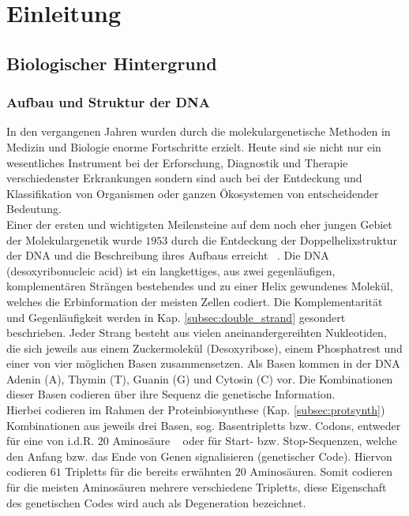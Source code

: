 \chapter{Einleitung} \label{sec:introduction}
\section{Biologischer Hintergrund} \label{sec:biology}
\subsection{Aufbau und Struktur der DNA} \label{subsec:dna}

In den vergangenen Jahren wurden durch die molekulargenetische Methoden in Medizin und Biologie enorme Fortschritte erzielt. Heute sind sie nicht nur ein wesentliches Instrument bei der Erforschung, Diagnostik und Therapie verschiedenster Erkrankungen sondern sind auch bei der Entdeckung und Klassifikation von Organismen oder ganzen Ökosystemen von entscheidender Bedeutung.  \\


Einer der ersten und wichtigsten Meilensteine auf dem noch eher jungen Gebiet der Molekulargenetik wurde $1953$ durch die Entdeckung der Doppelhelixstruktur der DNA und die Beschreibung ihres Aufbaus erreicht ~\cite{watson_1953}. Die DNA (desoxyribonucleic acid) ist ein langkettiges, aus zwei gegenläufigen, komplementären Strängen bestehendes und zu einer Helix gewundenes Molekül, welches die Erbinformation der meisten Zellen codiert. Die Komplementarität und Gegenläufigkeit werden in Kap. \ref{subsec:double_strand} gesondert beschrieben. Jeder Strang besteht aus vielen aneinandergereihten Nukleotiden, die sich jeweils aus einem Zuckermolekül (Desoxyribose), einem Phosphatrest und einer von vier möglichen Basen zusammensetzen. Als Basen kommen in der DNA Adenin (A), Thymin (T), Guanin (G) und Cytosin (C) vor. Die Kombinationen dieser Basen codieren über ihre Sequenz die genetische Information.  \\

Hierbei codieren im Rahmen der Proteinbiosynthese (Kap. \ref{subsec:protsynth}) Kombinationen aus jeweils drei Basen, sog. Basentripletts bzw. Codons, entweder für eine von i.d.R. $ 20 $ Aminosäure ~\cite{martin_1961, matthaei_1961} oder für Start- bzw. Stop-Sequenzen, welche den Anfang bzw. das Ende von Genen signalisieren (genetischer Code). Hiervon codieren $ 61 $ Tripletts für die bereits erwähnten $ 20 $ Aminosäuren. Somit codieren für die meisten Aminosäuren mehrere verschiedene Tripletts, diese Eigenschaft des genetischen Codes wird auch als Degeneration bezeichnet. \\

